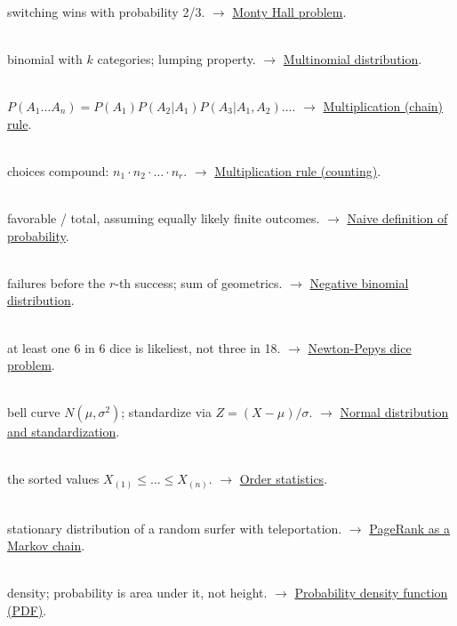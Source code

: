 \documentclass[11pt,a4paper]{article}
\begin{document}
\begin{description}[leftmargin=0pt,style=unboxed]
\item[\textbf{Monty Hall}]\hfill\\ switching wins with probability 2/3. $\to$ \hyperref[sec:monty-hall-problem]{Monty Hall problem}.
\item[\textbf{Multinomial distribution}]\hfill\\ binomial with $k$ categories; lumping property. $\to$ \hyperref[sec:multinomial-distribution]{Multinomial distribution}.
\item[\textbf{Multiplication (chain) rule}]\hfill\\ $P(A_{1}\ldots A_{n}) = P(A_{1})P(A_{2}|A_{1})P(A_{3}|A_{1},A_{2})\ldots$. $\to$ \hyperref[sec:multiplication-chain-rule]{Multiplication (chain) rule}.
\item[\textbf{Multiplication rule (counting)}]\hfill\\ choices compound: $n_{1}\cdot n_{2}\cdot \ldots \cdot n_r$. $\to$ \hyperref[sec:multiplication-rule-counting]{Multiplication rule (counting)}.
\item[\textbf{Naive definition}]\hfill\\ favorable / total, assuming equally likely finite outcomes. $\to$ \hyperref[sec:naive-definition-of-probability]{Naive definition of probability}.
\item[\textbf{Negative binomial}]\hfill\\ failures before the $r$-th success; sum of geometrics. $\to$ \hyperref[sec:negative-binomial-distribution]{Negative binomial distribution}.
\item[\textbf{Newton-Pepys}]\hfill\\ at least one 6 in 6 dice is likeliest, not three in 18. $\to$ \hyperref[sec:newton-pepys-dice-problem]{Newton-Pepys dice problem}.
\item[\textbf{Normal distribution}]\hfill\\ bell curve $N(\mu ,\sigma ^{2})$; standardize via $Z = (X-\mu )/\sigma$. $\to$ \hyperref[sec:normal-distribution-and-standardization]{Normal distribution and standardization}.
\item[\textbf{Order statistics}]\hfill\\ the sorted values $X_{(1)} \leq  \ldots  \leq  X_{(n)}$. $\to$ \hyperref[sec:order-statistics]{Order statistics}.
\item[\textbf{PageRank}]\hfill\\ stationary distribution of a random surfer with teleportation. $\to$ \hyperref[sec:pagerank-as-a-markov-chain]{PageRank as a Markov chain}.
\item[\textbf{PDF}]\hfill\\ density; probability is area under it, not height. $\to$ \hyperref[sec:probability-density-function-pdf]{Probability density function (PDF)}.

\end{description}
\end{document}
